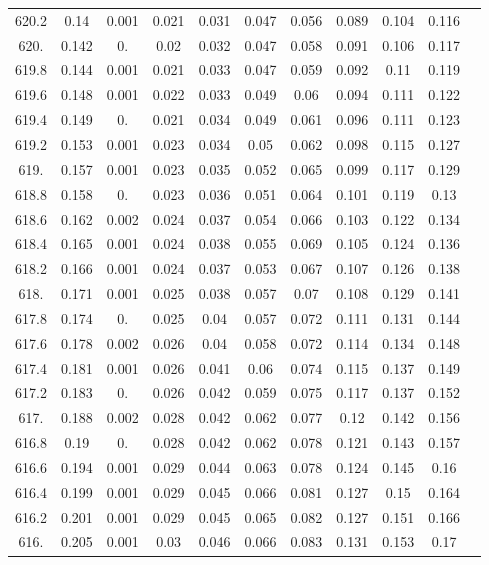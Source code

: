 \documentclass[12pt]{ctexart}
\numberwithin{equation}{section}
\begin{document}
\begin{longtable}{ccccccccccc}
620.2	&	0.14	&	0.001	&	0.021	&	0.031	&	0.047	&	0.056	&	0.089	&	0.104	&	0.116	\\
620.	&	0.142	&	0.	&	0.02	&	0.032	&	0.047	&	0.058	&	0.091	&	0.106	&	0.117	\\
619.8	&	0.144	&	0.001	&	0.021	&	0.033	&	0.047	&	0.059	&	0.092	&	0.11	&	0.119	\\
619.6	&	0.148	&	0.001	&	0.022	&	0.033	&	0.049	&	0.06	&	0.094	&	0.111	&	0.122	\\
619.4	&	0.149	&	0.	&	0.021	&	0.034	&	0.049	&	0.061	&	0.096	&	0.111	&	0.123	\\
619.2	&	0.153	&	0.001	&	0.023	&	0.034	&	0.05	&	0.062	&	0.098	&	0.115	&	0.127	\\
619.	&	0.157	&	0.001	&	0.023	&	0.035	&	0.052	&	0.065	&	0.099	&	0.117	&	0.129	\\
618.8	&	0.158	&	0.	&	0.023	&	0.036	&	0.051	&	0.064	&	0.101	&	0.119	&	0.13	\\
618.6	&	0.162	&	0.002	&	0.024	&	0.037	&	0.054	&	0.066	&	0.103	&	0.122	&	0.134	\\
618.4	&	0.165	&	0.001	&	0.024	&	0.038	&	0.055	&	0.069	&	0.105	&	0.124	&	0.136	\\
618.2	&	0.166	&	0.001	&	0.024	&	0.037	&	0.053	&	0.067	&	0.107	&	0.126	&	0.138	\\
618.	&	0.171	&	0.001	&	0.025	&	0.038	&	0.057	&	0.07	&	0.108	&	0.129	&	0.141	\\
617.8	&	0.174	&	0.	&	0.025	&	0.04	&	0.057	&	0.072	&	0.111	&	0.131	&	0.144	\\
617.6	&	0.178	&	0.002	&	0.026	&	0.04	&	0.058	&	0.072	&	0.114	&	0.134	&	0.148	\\
617.4	&	0.181	&	0.001	&	0.026	&	0.041	&	0.06	&	0.074	&	0.115	&	0.137	&	0.149	\\
617.2	&	0.183	&	0.	&	0.026	&	0.042	&	0.059	&	0.075	&	0.117	&	0.137	&	0.152	\\
617.	&	0.188	&	0.002	&	0.028	&	0.042	&	0.062	&	0.077	&	0.12	&	0.142	&	0.156	\\
616.8	&	0.19	&	0.	&	0.028	&	0.042	&	0.062	&	0.078	&	0.121	&	0.143	&	0.157	\\
616.6	&	0.194	&	0.001	&	0.029	&	0.044	&	0.063	&	0.078	&	0.124	&	0.145	&	0.16	\\
616.4	&	0.199	&	0.001	&	0.029	&	0.045	&	0.066	&	0.081	&	0.127	&	0.15	&	0.164	\\
616.2	&	0.201	&	0.001	&	0.029	&	0.045	&	0.065	&	0.082	&	0.127	&	0.151	&	0.166	\\
616.	&	0.205	&	0.001	&	0.03	&	0.046	&	0.066	&	0.083	&	0.131	&	0.153	&	0.17	\\

\end{longtable}
\end{document}
